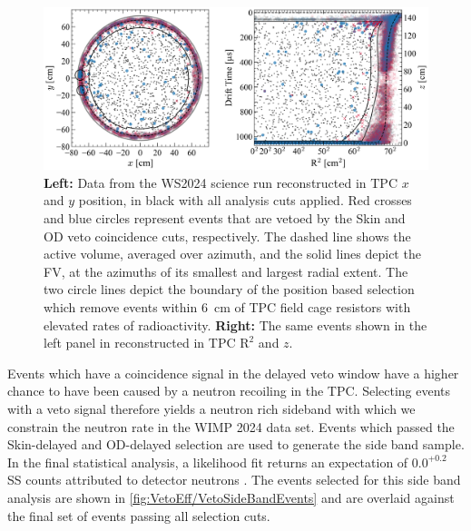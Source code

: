 \begin{figure}[ht!]
    \centering
    \includegraphics[width=\linewidth]{figures/VetoEfficiency/WS2024_TPCPosPlots_2panel.png}
    \caption[Data from the WS2024 science run reconstructed in TPC with events that are vetoed coloured in red and blue.]{\textbf{Left:} Data from the WS2024 science run reconstructed in TPC $x$ and $y$ position, in black with all analysis cuts applied. Red crosses and blue circles represent events that are vetoed by the Skin and OD veto coincidence cuts, respectively. The dashed line shows the active volume, averaged over azimuth, and the solid lines depict the FV, at the azimuths of its smallest and largest radial extent. The two circle lines depict the boundary of the position based selection which remove events within 6~cm of TPC field cage resistors with elevated rates of radioactivity. \textbf{Right:} The same events shown in the left panel in reconstructed in TPC $\text{R}^2$ and $z$.}
    \label{fig:VetoEff/WS2024_TPCPosPlots_2panel}
\end{figure}

Events which have a coincidence signal in the delayed veto window have a higher chance to have been caused by a neutron recoiling in the TPC. Selecting events with a veto signal therefore yields a neutron rich sideband with which we constrain the neutron rate in the WIMP 2024 data set.
Events which passed the Skin-delayed and OD-delayed selection are used to generate the side band sample. In the final statistical analysis, a likelihood fit returns an expectation of $0.0^{+0.2}$ SS counts attributed to detector neutrons \cite{LZCollaboration:2024lux}. The events selected for this side band analysis are shown in \autoref{fig:VetoEff/VetoSideBandEvents} and are overlaid against the final set of events passing all selection cuts. 

